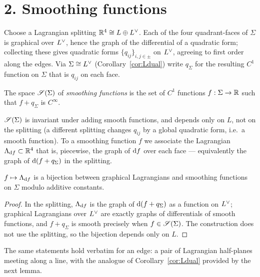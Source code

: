 \documentclass[11pt]{article}
\begin{document}
\section*{2. Smoothing functions}

Choose a Lagrangian splitting $\mathbb{R}^4\cong L\oplus L^{\vee}$. Each of the four
quadrant-faces of $\Sigma$ is graphical over $L^{\vee}$, hence the graph of the
differential of a quadratic form; collecting these gives quadratic forms
$\{q_{ij}\}_{i,j\in\pm}$ on $L^{\vee}$, agreeing to first order along the edges.
Via $\Sigma\cong L^{\vee}$ (Corollary~\ref{cor:Ldual}) write $q_\Sigma$ for the
resulting $C^1$ function on $\Sigma$ that is $q_{ij}$ on each face.

\begin{qeightdefinition}\label{def:smoothing}
The space $\mathscr S(\Sigma)$ of \emph{smoothing functions} is the set of $C^1$
functions $f:\Sigma\to\mathbb{R}$ such that $f+q_\Sigma$ is $C^\infty$.
\end{qeightdefinition}

$\mathscr S(\Sigma)$ is invariant under adding smooth functions, and depends only on
$L$, not on the splitting (a different splitting changes $q_{ij}$ by a global
quadratic form, i.e.\ a smooth function). To a smoothing function $f$ we
associate the Lagrangian $\Lambda_{\mathrm d f}\subset\mathbb{R}^4$ that is, piecewise, the graph
of $\mathrm d f$ over each face — equivalently the graph of $\mathrm d(f+q_\Sigma)$ in the
splitting.

\begin{qeightlemma}\label{lem:bijection}
$f\mapsto \Lambda_{\mathrm d f}$ is a bijection between graphical Lagrangians and
smoothing functions on $\Sigma$ modulo additive constants.
\end{qeightlemma}

\begin{proof}
In the splitting, $\Lambda_{\mathrm d f}$ is the graph of $\mathrm d(f+q_\Sigma)$ as a function
on $L^{\vee}$; graphical Lagrangians over $L^{\vee}$ are exactly graphs of
differentials of smooth functions, and $f+q_\Sigma$ is smooth precisely when
$f\in\mathscr S(\Sigma)$. The construction does not use the splitting, so the bijection
depends only on $L$.
\end{proof}

\noindent The same statements hold verbatim for an edge: a pair of Lagrangian
half-planes meeting along a line, with the analogue of
Corollary~\ref{cor:Ldual} provided by the next lemma.
\end{document}
